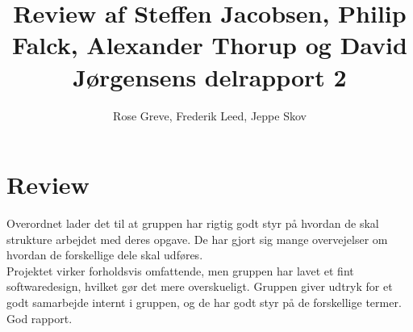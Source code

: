 \documentclass[12pt]{article}
\title{Review af Steffen Jacobsen, Philip Falck, Alexander Thorup og David Jørgensens delrapport 2}
\author{Rose Greve, Frederik Leed, Jeppe Skov}
\begin{document}
\maketitle


\section{Review}
Overordnet lader det til at gruppen har rigtig godt styr på hvordan de skal strukture arbejdet med deres opgave. De har gjort sig mange overvejelser om hvordan de forskellige dele skal udføres. \\ 
Projektet virker forholdsvis omfattende, men gruppen har lavet et fint softwaredesign, hvilket gør det mere overskueligt. 
Gruppen giver udtryk for et godt samarbejde internt i gruppen, og de har godt styr på de forskellige termer.
God rapport.
\end{document}
